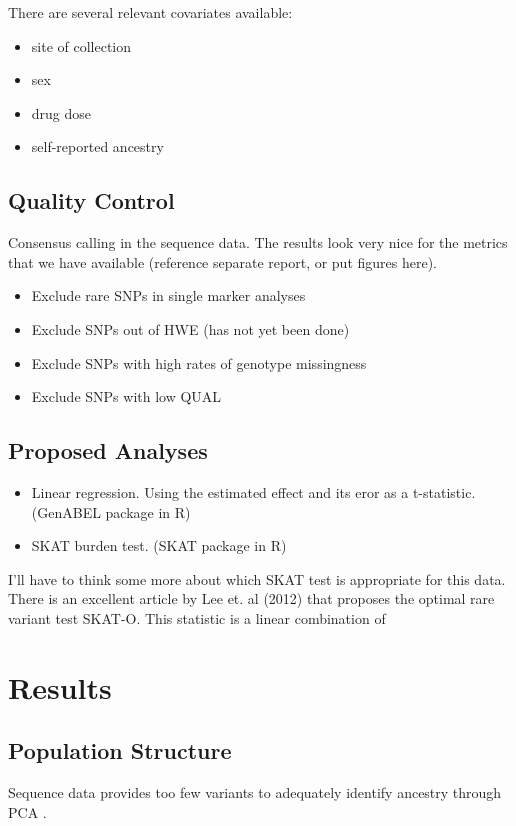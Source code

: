 \documentclass[paper=a4, fontsize=11pt]{scrartcl}	%
\numberwithin{equation}{section}		%
\numberwithin{figure}{section}			%
\numberwithin{table}{section}				%
\begin{document}
There are several relevant covariates available:
	\begin{itemize}
		\item site of collection
		\item sex
		\item drug dose
		\item self-reported ancestry
	\end{itemize}

	\subsection{Quality Control}
	Consensus calling in the sequence data. The results look very nice for the metrics that we have available (reference separate report, or put figures here).
	
	\begin{itemize}
		\item Exclude rare SNPs in single marker analyses
		\item Exclude SNPs out of HWE (has not yet been done)
		\item Exclude SNPs with high rates of genotype missingness
		\item Exclude SNPs with low QUAL
	\end{itemize}
	\subsection{Proposed Analyses}
	\begin{itemize}
		\item Linear regression. Using the estimated effect and its eror as a t-statistic. (GenABEL package in R)
		\item SKAT burden test. (SKAT package in R)
	\end{itemize}
	
	I'll have to think some more about which SKAT test is appropriate for this data. There is an excellent article by Lee et. al (2012) that proposes the optimal rare variant test SKAT-O. This statistic is a linear combination of

\newpage

\section{Results}

	\subsection{Population Structure}
Sequence data provides too few variants to adequately identify ancestry through PCA .
\end{document}

